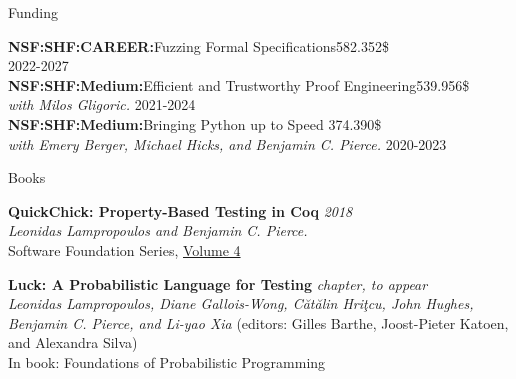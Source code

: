 \documentclass{resume} %
\begin{document}
\begin{rSection}{Funding}

  {\bf NSF:SHF:CAREER:}{Fuzzing Formal Specifications}\hfill{582.352\$}\\
  2022-2027\\
  
  {\bf NSF:SHF:Medium:}{Efficient and Trustworthy Proof Engineering}\hfill{539.956\$}\\
  {\em with Milos Gligoric.} 2021-2024\\
  
  {\bf NSF:SHF:Medium:}Bringing Python up to Speed \hfill{374.390\$}\\
  {\em with Emery Berger, Michael Hicks, and Benjamin C. Pierce.} 2020-2023\\
  
\end{rSection}


\newcommand{\Catalin}{C\u{a}t\u{a}lin\xspace}
\newcommand{\Hritcu}{Hri\c{t}cu\xspace}
\newcommand{\Denes}{D\'en\`es\xspace}

\newcommand{\pub}[4]{
  {\bf #1} \hfill {\href{https://lemonidas.github.io/pdf/#2}{\bf \em #4}}\\
  {#3}
  }

\newcommand{\pubtwo}[6]{
  {\bf #1} \hfill {\href{https://lemonidas.github.io/pdf/#2}{\bf \em #4}}, {\href{https://lemonidas.github.io/pdf/#5}{\bf \em #6}}\\
  {#3}
  }

\newcommand{\pubsub}[5]{
  {\bf #1:} \hfill {\href{https://lemonidas.github.io/pdf/#2}{\bf \em #4}}\\
  {\bf #5}\\
  {#3}
  }

\begin{rSection}{Books}

  {\bf QuickChick: Property-Based Testing in Coq} \hfill {\em 2018}\\
  {\em Leonidas Lampropoulos and Benjamin C. Pierce.}\\
  {Software Foundation Series, \href{https://softwarefoundations.cis.upenn.edu}{Volume 4}}

  {\bf Luck: A Probabilistic Language for Testing} \hfill {\em chapter, to appear}\\
  {\em Leonidas Lampropoulos, Diane Gallois-Wong, C\u{a}t\u{a}lin Hri\c{t}cu, John Hughes, Benjamin C. Pierce, and Li-yao Xia} {(editors: Gilles Barthe, Joost-Pieter Katoen, and Alexandra Silva)}\\
  In book: {Foundations of Probabilistic Programming} \\

  
\end{rSection}
\end{document}
